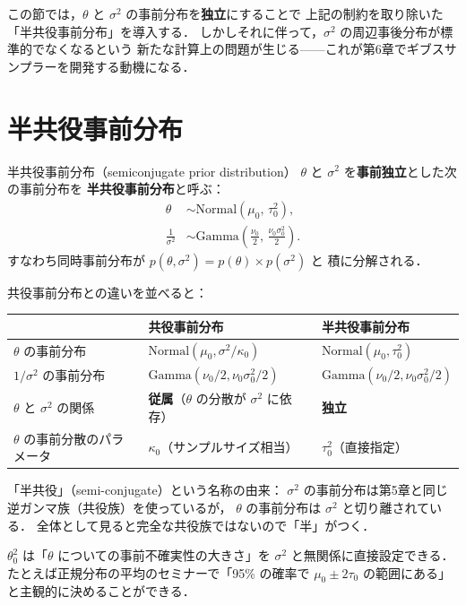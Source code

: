 \documentclass[lualatex,ja=standard,a4paper,12pt]{bxjsarticle}
\begin{document}
\noindent この節では，$\theta$ と $\sigma^2$ の事前分布を\textbf{独立}にすることで
上記の制約を取り除いた「半共役事前分布」を導入する．
しかしそれに伴って，$\sigma^2$ の周辺事後分布が標準的でなくなるという
新たな計算上の問題が生じる——これが第6章でギブスサンプラーを開発する動機になる．

\section{半共役事前分布}

\begin{defbox}{半共役事前分布（semiconjugate prior distribution）}
$\theta$ と $\sigma^2$ を\textbf{事前独立}とした次の事前分布を
\textbf{半共役事前分布}と呼ぶ：
\begin{align*}
  \theta &\sim \mathrm{Normal}(\mu_0,\, \tau_0^2), \\
  \frac{1}{\sigma^2} &\sim \mathrm{Gamma}\!\left(\frac{\nu_0}{2},\, \frac{\nu_0 \sigma_0^2}{2}\right).
\end{align*}
すなわち同時事前分布が $p(\theta, \sigma^2) = p(\theta) \times p(\sigma^2)$ と
積に分解される．
\end{defbox}

\noindent 共役事前分布との違いを並べると：

\begin{center}
\renewcommand{\arraystretch}{1.8}
\begin{tabular}{lll}
\toprule
 & 共役事前分布 & 半共役事前分布 \\
\midrule
$\theta$ の事前分布 & $\mathrm{Normal}(\mu_0, \sigma^2/\kappa_0)$
  & $\mathrm{Normal}(\mu_0, \tau_0^2)$ \\
$1/\sigma^2$ の事前分布 & $\mathrm{Gamma}(\nu_0/2, \nu_0\sigma_0^2/2)$
  & $\mathrm{Gamma}(\nu_0/2, \nu_0\sigma_0^2/2)$ \\
$\theta$ と $\sigma^2$ の関係 & \textbf{従属}（$\theta$ の分散が $\sigma^2$ に依存）
  & \textbf{独立} \\
$\theta$ の事前分散のパラメータ & $\kappa_0$（サンプルサイズ相当）
  & $\tau_0^2$（直接指定） \\
\bottomrule
\end{tabular}
\end{center}

\begin{pointbox}
「半共役」（semi-conjugate）という名称の由来：
$\sigma^2$ の事前分布は第5章と同じ逆ガンマ族（共役族）を使っているが，
$\theta$ の事前分布は $\sigma^2$ と切り離されている．
全体として見ると完全な共役族ではないので「半」がつく．

\medskip
$\theta_0^2$ は「$\theta$ についての事前不確実性の大きさ」を
$\sigma^2$ と無関係に直接設定できる．
たとえば正規分布の平均のセミナーで「95\% の確率で $\mu_0 \pm 2\tau_0$ の範囲にある」
と主観的に決めることができる．
\end{pointbox}
\end{document}
